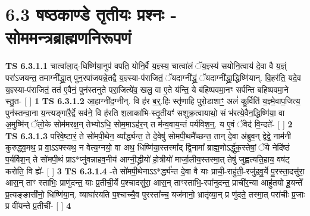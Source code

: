 \documentclass[17pt]{extarticle}
\begin{document}
     \section*{ 6.3      षष्ठकाण्डे तृतीयः प्रश्नः - सोममन्त्रब्राह्मणनिरूपणं }
                                        \textbf{ TS 6.3.1.1} \newline
                  चात्वा॑ला॒द्-धिष्णि॑या॒नुप॑ वपति॒ योनि॒र्वै य॒ज्ञ्स्य॒ चात्वा॑लं ॅय॒ज्ञ्स्य॑ सयोनि॒त्वाय॑ दे॒वा वै य॒ज्ञ्ं परा॑ऽजयन्त॒ तमाग्नी᳚द्ध्रा॒त् पुन॒रपा॑जयन्ने॒तद्वै य॒ज्ञ्स्या-प॑राजितं॒ ॅयदाग्नी᳚द्ध्रं॒ ॅयदाग्नी᳚द्ध्रा॒द्धिष्णि॑यान्. वि॒हर॑ति॒ यदे॒व  य॒ज्ञ्स्या-प॑राजितं॒ तत॑ ए॒वैनं॒ पुन॑स्तनुते परा॒जित्ये॑व॒ खलु॒ वा ए॒ते य॑न्ति॒ ये ब॑हिष्पवमा॒नꣳ सर्प॑न्ति बहिष्पवमा॒ने स्तु॒त- [  ] \textbf{  1} \newline
                  \newline
                                \textbf{ TS 6.3.1.2} \newline
                  आ॒हाग्नी॑द॒ग्नीन्. वि ह॑र ब॒र्॒.हिः स्तृ॑णाहि पुरो॒डाशाꣳ॒॒ अलं॑ कु॒र्विति॑ य॒ज्ञ्मे॒वाप॒जित्य॒ पुन॑स्तन्वा॒ना य॒न्त्यङ्गा॑रै॒र्द्वे सव॑ने॒ वि ह॑रति श॒लाका॑भि-स्तृ॒तीयꣳ॑ सशुक्र॒त्वायाथो॒ सं भ॑रत्ये॒वैन॒द्धिष्णि॑या॒ वा अ॒मुष्मि॑न् ॅलो॒के सोम॑मरक्ष॒न् तेभ्योऽधि॒ सोम॒माऽह॑र॒न् त म॑न्व॒वाय॒न्तं पर्य॑विश॒न्॒. य ए॒वं ॅवेद॑ वि॒न्दते॑- [  ] \textbf{  2} \newline
                  \newline
                                \textbf{ TS 6.3.1.3} \newline
                  परिवे॒ष्टारं॒ ते सो॑मपी॒थेन॒ व्या᳚र्द्ध्यन्त॒ ते दे॒वेषु॑ सोमपी॒थमै᳚च्छन्त॒ तान् दे॒वा अ॑ब्रुव॒न् द्वेद्वे॒ नाम॑नी कुरुद्ध्व॒मथ॒ प्र वा॒ऽऽफ्स्यथ॒ न वेत्य॒ग्नयो॒ वा अथ॒ धिष्णि॑या॒स्तस्मा᳚द् द्वि॒नामा᳚ ब्राह्म॒णोऽर्द्धु॑क॒स्तेषां॒ ॅये नेदि॑ष्ठं प॒र्यवि॑श॒न् ते सो॑मपी॒थं प्राऽ*प्नु॑वन्नाहव॒नीय॑ आग्नी॒द्ध्रीयो॑ हो॒त्रीयो॑ मार्जा॒लीय॒स्तस्मा॒त् तेषु॑ जुह्वत्यति॒हाय॒ वष॑ट् करोति॒ वि ह्ये॑- [  ] \textbf{  3} \newline
                  \newline
                                \textbf{ TS 6.3.1.4} \newline
                  -ते सो॑मपी॒थेनाऽऽ*र्द्ध्य॑न्त दे॒वा वै याः प्राची॒-राहु॑ती॒-रजु॑हवु॒र्ये पु॒रस्ता॒दसु॑रा॒ आस॒न् ताꣳ स्ताभिः॒ प्राणु॑दन्त॒ याः प्र॒तीची॒र्ये प॒श्चादसु॑रा॒ आस॒न् ताꣳस्ताभि॒-रपा॑नुदन्त॒ प्राची॑र॒न्या आहु॑तयो हू॒यन्ते᳚ प्र॒त्यङ्ङासी॑नो॒ धिष्णि॑या॒न्. व्याघा॑रयति प॒श्चाच्चै॒व पुरस्ता᳚च्च॒ यज॑मानो॒ भ्रातृ॑व्या॒न् प्र णु॑दते॒ तस्मा॒त् परा॑चीः प्र॒जाः प्र वी॑यन्ते प्र॒तीची᳚- [  ] \textbf{  4} \newline
\end{document}
